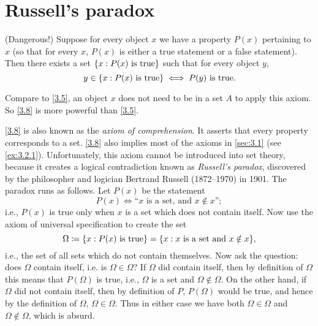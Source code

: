 \section{Russell's paradox}\label{sec:3.2}

\begin{ax}\label{3.8}
  (Dangerous!)
  Suppose for every object \(x\) we have a property \(P(x)\) pertaining to \(x\) (so that for every \(x\), \(P(x)\) is either a true statement or a false statement).
  Then there exists a set \(\left\lbrace x : P(x) \text{ is true}\right\rbrace\) such that for every object \(y\),
  \[
    y \in \left\lbrace x : P(x) \text{ is true}\right\rbrace \iff P(y) \text{ is true}.
  \]
\end{ax}

\begin{note}
  Compare to \cref{3.5}, an object \(x\) does not need to be in a set \(A\) to apply this axiom.
  So \cref{3.8} is more powerful than \cref{3.5}.
\end{note}

\begin{note}
  \cref{3.8} is also known as the \emph{axiom of comprehension}.
  It asserts that every property corresponds to a set.
  \cref{3.8} also implies most of the axioms in \cref{sec:3.1} (see \cref{ex:3.2.1}).
  Unfortunately, this axiom cannot be introduced into set theory, because it creates a logical contradiction known as \emph{Russell's paradox}, discovered by the philosopher and logician Bertrand Russell (1872--1970) in 1901.
  The paradox runs as follows.
  Let \(P(x)\) be the statement
  \[
    P(x) \iff \text{``\(x\) is a set, and \(x \notin x\)''};
  \]
  i.e., \(P(x)\) is true only when \(x\) is a set which does not contain itself.
  Now use the axiom of universal specification to create the set
  \[
    \Omega \coloneqq \set{x : P(x) \text{ is true}} = \set{x : x \text{ is a set and } x \notin x},
  \]
  i.e., the set of all sets which do not contain themselves.
  Now ask the question: does \(\Omega\) contain itself, i.e. is \(\Omega \in \Omega\)?
  If \(\Omega\) did contain itself, then by definition of \(\Omega\) this means that \(P(\Omega)\) is true, i.e., \(\Omega\) is a set and \(\Omega \notin \Omega\).
  On the other hand, if \(\Omega\) did not contain itself, then by definition of \(P\), \(P(\Omega)\) would be true, and hence by the definition of \(\Omega\), \(\Omega \in \Omega\).
  Thus in either case we have both \(\Omega \in \Omega\) and \(\Omega \notin \Omega\), which is absurd.
\end{note}

